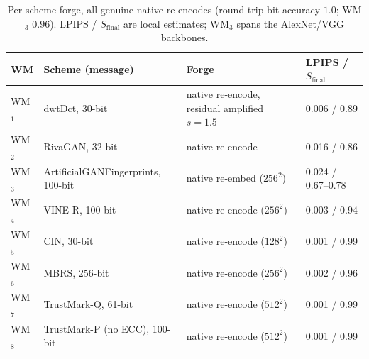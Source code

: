 \documentclass{article} %
\begin{document}
\begin{table}[H]
\centering
\footnotesize
\caption{Per-scheme forge, all genuine native re-encodes (round-trip bit-accuracy $1.0$; WM$_3$ $0.96$). LPIPS / $S_\text{final}$ are local estimates; WM$_3$ spans the AlexNet/VGG backbones.}
\label{tab:schemes}
\setlength{\tabcolsep}{4pt}
\begin{tabular}{llll}
\toprule
WM & Scheme (message) & Forge & LPIPS / $S_\text{final}$ \\
\midrule
WM$_1$ & dwtDct, 30-bit                  & native re-encode, residual amplified $s{=}1.5$ & 0.006 / 0.89 \\
WM$_2$ & RivaGAN, 32-bit                 & native re-encode                                & 0.016 / 0.86 \\
WM$_3$ & ArtificialGANFingerprints, 100-bit & native re-embed ($256^2$)                    & 0.024 / 0.67--0.78 \\
WM$_4$ & VINE-R, 100-bit                 & native re-encode ($256^2$)                      & 0.003 / 0.94 \\
WM$_5$ & CIN, 30-bit                     & native re-encode ($128^2$)                      & 0.001 / 0.99 \\
WM$_6$ & MBRS, 256-bit                   & native re-encode ($256^2$)                      & 0.002 / 0.96 \\
WM$_7$ & TrustMark-Q, 61-bit             & native re-encode ($512^2$)                      & 0.001 / 0.99 \\
WM$_8$ & TrustMark-P (no ECC), 100-bit   & native re-encode ($512^2$)                      & 0.001 / 0.99 \\
\bottomrule
\end{tabular}
\end{table}
\end{document}
